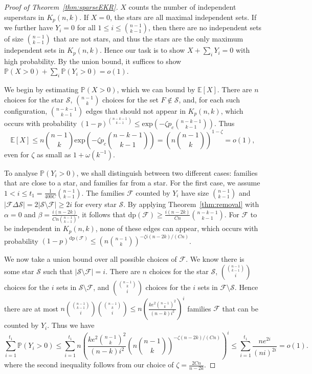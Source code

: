 \documentclass[11pt]{article}
\theoremstyle{definition}
\newcommand{\cS}{\mathcal{S}}
\newcommand{\cF}{\mathcal{F}}
\newcommand{\3}{\bf{3}}
\newcommand{\card}[1]{\left| #1 \right|}
\newcommand{\disj}{\mathrm{dp}}
\newcommand{\Prb}{\mathbb{P}}
\newcommand{\Exp}{\mathbb{E}}
\begin{document}
\begin{proof}[Proof of Theorem~\ref{thm:sparseEKR}]
$X$ counts the number of independent superstars in $K_p(n,k)$.  If $X = 0$, the stars are all maximal independent sets.  If we further have $Y_i = 0$ for all $1 \le i \le \binom{n-1}{k-1}$, then there are no independent sets of size $\binom{n-1}{k-1}$ that are not stars, and thus the stars are the only maximum independent sets in $K_p(n,k)$.  Hence our task is to show $X + \sum_i Y_i = 0$ with high probability.  By the union bound, it suffices to show $\Prb(X > 0) + \sum_i \Prb(Y_i > 0) = o(1)$.

We begin by estimating $\Prb(X > 0)$, which we can bound by $\Exp[X]$.  There are $n$ choices for the star $\cS$, $\binom{n-1}{k}$ choices for the set $F \notin \cS$, and, for each such configuration, $\binom{n-k-1}{k-1}$ edges that should not appear in $K_p(n,k)$, which occurs with probability $(1 - p)^{\binom{n-k-1}{k-1}} \le \mathrm{exp} \left( - \zeta p_c \binom{n-k-1}{k-1} \right)$. Thus
\begin{equation} \label{eqn:Xbound}
\Exp[X] \le n \binom{n-1}{k} \mathrm{exp} \left( - \zeta p_c \binom{n-k-1}{k-1} \right) = \left( n \binom{n-1}{k} \right)^{1 - \zeta} = o(1),
\end{equation}
even for $\zeta$ as small as $1 + \omega \left( k^{-1} \right)$.

To analyse $\Prb(Y_i > 0)$, we shall distinguish between two different cases: families that are close to a star, and families far from a star.  For the first case, we assume $1 < i \le t_1 = \frac{1}{400C} \binom{n-1}{k-1}$.  The families $\cF$ counted by $Y_i$ have size $\binom{n-1}{k-1}$ and $\card{\cF \Delta \cS} = 2 \card{\cS \setminus \cF} \ge 2i$ for every star $\cS$.  By applying Theorem~\ref{thm:removal} with $\alpha = 0$ and $\beta = \frac{i(n-2k)}{Cn \binom{n-1}{k-1}}$, it follows that $\disj(\cF) \ge \frac{i(n-2k)}{Cn} \binom{n-k-1}{k-1}$.  For $\cF$ to be independent in $K_p(n,k)$, none of these edges can appear, which occurs with probability $(1 - p)^{\disj(\cF)} \le \left( n \binom{n-1}{k} \right)^{ - \zeta i (n-2k)/ (Cn)}$.

We now take a union bound over all possible choices of $\cF$.  We know there is some star $\cS$ such that $\card{\cS \setminus \cF} = i$.  There are $n$ choices for the star $\cS$, $\binom{\binom{n-1}{k-1}}{i}$ choices for the $i$ sets in $\cS \setminus \cF$, and $\binom{\binom{n-1}{k}}{i}$ choices for the $i$ sets in $\cF \setminus \cS$.  Hence there are at most $n \binom{ \binom{n-1}{k-1} }{i} \binom{ \binom{n-1}{k} }{i} \le n \left( \frac{k e^2 \binom{n-1}{k}^2}{(n-k) i^2} \right)^i$ families $\cF$ that can be counted by $Y_i$.  Thus we have
\begin{equation} \label{eqn:medYbound}
\sum_{i = 1}^{t_1} \Prb(Y_i > 0) \le \sum_{i=1}^{t_1} n \left( \frac{ke^2 \binom{n-1}{k}^2 }{(n-k) i^2} \left(n \binom{n-1}{k} \right)^{- \zeta (n-2k)/(Cn) } \right)^i \le \sum_{i=1}^{t_1} \frac{ne^{2i}}{(ni)^{2i}} = o(1).
\end{equation}
where the second inequality follows from our choice of $\zeta = \frac{2Cn}{n-2k}$.


\end{proof}
\end{document}
